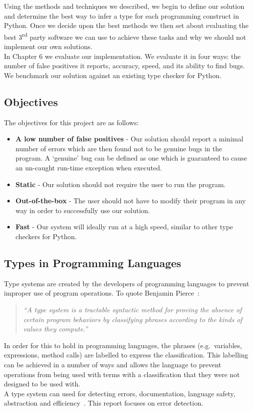 \documentclass[12pt, titlepage]{article}
\begin{document}
\indent Using the methods and techniques we described, we begin to define our solution and determine the best way to infer a type for each programming construct in Python. Once we decide upon the best methods we then set about evaluating the best 3\textsuperscript{rd} party software we can use to achieve these tasks and why we should not implement our own solutions. \\
\indent In Chapter 6 we evaluate our implementation. We evaluate it in four ways: the number of false positives it reports, accuracy, speed, and its ability to find bugs. We benchmark our solution against an existing type checker for Python.

\subsection{Objectives}
The objectives for this project are as follows:
\begin{itemize}
	\item \textbf{A low number of false positives} - Our solution should report a minimal number of errors which are then found not to be genuine bugs in the program. A `genuine' bug can be defined as one which is guaranteed to cause an un-caught run-time exception when executed.
	\item \textbf{Static} - Our solution should not require the user to run the program.
	\item \textbf{Out-of-the-box} - The user should not have to modify their program in any way in order to successfully use our solution.
	\item \textbf{Fast} - Our system will ideally run at a high speed, similar to other type checkers for Python.
\end{itemize} 

\subsection{Types in Programming Languages}
Type systems are created by the developers of programming languages to prevent improper use of program operations. To quote Benjamin Pierce~\cite{pierce02}:
\begin{quote}
	\emph{``A type system is a tractable syntactic method for proving the absence of certain program behaviors by classifying phrases according to the kinds of values they compute.''}
\end{quote}
In order for this to hold in programming languages, the phrases (e.g.\ variables, expressions, method calls) are labelled to express the classification. This labelling can be achieved in a number of ways and allows the language to prevent operations from being used with terms with a classification that they were not designed to be used with. \\
\indent A type system can used for detecting errors, documentation, language safety, abstraction and efficiency~\cite{pierce02}. This report focuses on error detection.
\end{document}
